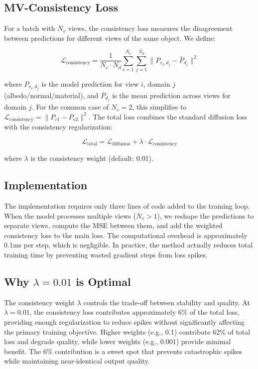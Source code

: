 \documentclass{article}
\begin{document}
\subsection{MV-Consistency Loss}

For a batch with $N_v$ views, the consistency loss measures the disagreement between predictions for different views of the same object. We define:

\begin{equation}
\mathcal{L}_{\text{consistency}} = \frac{1}{N_v \cdot N_d} \sum_{i=1}^{N_v} \sum_{j=1}^{N_d} \|P_{v_i,d_j} - \bar{P}_{d_j}\|^2
\end{equation}

where $P_{v_i,d_j}$ is the model prediction for view $i$, domain $j$ (albedo/normal/material), and $\bar{P}_{d_j}$ is the mean prediction across views for domain $j$. For the common case of $N_v=2$, this simplifies to $\mathcal{L}_{\text{consistency}} = \|P_{v1} - P_{v2}\|^2$. The total loss combines the standard diffusion loss with the consistency regularization:

\begin{equation}
\mathcal{L}_{\text{total}} = \mathcal{L}_{\text{diffusion}} + \lambda \cdot \mathcal{L}_{\text{consistency}}
\end{equation}

where $\lambda$ is the consistency weight (default: 0.01).

\subsection{Implementation}

The implementation requires only three lines of code added to the training loop. When the model processes multiple views ($N_v > 1$), we reshape the predictions to separate views, compute the MSE between them, and add the weighted consistency loss to the main loss. The computational overhead is approximately 0.1ms per step, which is negligible. In practice, the method actually reduces total training time by preventing wasted gradient steps from loss spikes.

\subsection{Why $\lambda=0.01$ is Optimal}

The consistency weight $\lambda$ controls the trade-off between stability and quality. At $\lambda=0.01$, the consistency loss contributes approximately 6\% of the total loss, providing enough regularization to reduce spikes without significantly affecting the primary training objective. Higher weights (e.g., 0.1) contribute 62\% of total loss and degrade quality, while lower weights (e.g., 0.001) provide minimal benefit. The 6\% contribution is a sweet spot that prevents catastrophic spikes while maintaining near-identical output quality.
\end{document}
